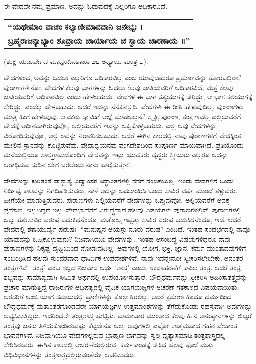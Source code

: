 ಈ ವೇದವೇ ನಮ್ಮ ಪ್ರಮಾಣ. ಅದನ್ನು ಓದುವುದಕ್ಕೆ ಎಲ್ಲರಿಗೂ ಅಧಿಕಾರವಿದೆ.

\smallskip

\begin{longtable}{@{\hspace{-10pt}}l@{}}
\textbf{“ಯಥೇಮಾಂ ವಾಚಂ ಕಲ್ಯಾಣೀಮಾವದಾನಿ ಜನೇಭ್ಯಃ ।} \\
\textbf{ಬ್ರಹ್ಮರಾಜನ್ಯಾಭ್ಯಾಂ ಶೂದ್ರಾಯ ಚಾರ್ಯಾಯ ಚ ಸ್ವಾಯ ಚಾರಣಾಯ ॥”} \\
\end{longtable}

\hfill (ಶುಕ್ಲ ಯಜುರ್ವೇದ ಮಾಧ್ಯಂದಿನಶಾಖಾ ೨೬ ಅಧ್ಯಾಯ ಮಂತ್ರ ೨).

\smallskip

ವೇದಗಳಿಂದ, ಅವನ್ನು ಓದಲು ಎಲ್ಲರಿಗೂ ಅಧಿಕಾರವಿಲ್ಲ ಎಂಬ ಯಾವುದಾದರೂ ಪ್ರಮಾಣವನ್ನು ತೋರಬಲ್ಲಿರಾ? ಪುರಾಣಗಳೇನೋ, ವೇದಗಳ ಕೆಲವು ಭಾಗಗಳನ್ನು ಓದಲು ಕೆಲವು ಜಾತಿಯವರಿಗೆ ಅಧಿಕಾರವಿದೆ, ಮತ್ತೆ ಕೆಲವು ಜಾತಿಯವರಿಗೆ ಅಧಿಕಾರವಿಲ್ಲ ಎಂದು ಹೇಳಬಹುದು. ವೇದಗಳ ಈ ಭಾಗ ಸತ್ಯಯುಗಕ್ಕೆ ಸೇರಿದ್ದು, ಆ ಭಾಗ ಕಲಿಯುಗಕ್ಕೆ ಸೇರಿದ್ದು, ಎಂದೆಲ್ಲ ಹೇಳಬಹುದು. ಆದರೆ ಇದನ್ನು ನೆನಪಿನಲ್ಲಿಡಿ. ವೇದಗಳು ಈ ರೀತಿ ಹೇಳುವುದಿಲ್ಲ. ಪುರಾಣಗಳು ಮಾತ್ರ ಹೀಗೆ ಹೇಳುವುವು. ಸೇವಕರು ಸ್ವಾಮಿಗೆ ಆಜ್ಞೆ ಮಾಡಬಲ್ಲನೆ? ಸ್ಮೃತಿ, ಪುರಾಣ, ತಂತ್ರ ಇವೆಲ್ಲ ಎಲ್ಲಿಯವರೆಗೆ ವೇದಕ್ಕೆ ಅಧೀನವಾಗಿರುವುವೋ, ಅಲ್ಲಿಯವರೆಗೆ ಇವನ್ನು ಒಪ್ಪಿಕೊಳ್ಳಬಹುದು. ಎಲ್ಲಿ ಅವು ವೇದಗಳನ್ನು ವಿರೋಧಿಸುವುವೋ, ಅಲ್ಲಿ ಅವನ್ನು ನಿರಾಕರಿಸಬಹುದು. ಆದರೆ ಈಗಿನ ಕಾಲದಲ್ಲಿ ನಾವು ಪುರಾಣಗಳಿಗೆ ವೇದಕ್ಕಿಂತ ಮೇಲಿನ ಸ್ಥಾನವನ್ನು ಕೊಟ್ಟಿರುವೆವು. ವೇದಾಧ್ಯಯನವು ವಂಗದೇಶದಿಂದ ಸಂಪೂರ್ಣ ಮಾಯವಾಗಿದೆ. ಪ್ರತಿಯೊಂದು ಮನೆಯಲ್ಲಿಯೂ ಸಾಲಿಗ್ರಾಮದೊಂದಿಗೆ ವೇದವನ್ನು ಇಟ್ಟು ಯುವಕರು ವೃದ್ಧರು ಸ್ತ್ರೀಯರು ಎಲ್ಲರೂ ಅದನ್ನು ಆರಾಧಿಸುವ ಸುದಿನ ಬೇಗ ಬರಲೆಂದು ನಾನು ಹಾರೈಸುತ್ತೇನೆ.

ವೇದಗಳನ್ನು ಕುರಿತಂತೆ ಪಾಶ್ಚಾತ್ಯ ವಿದ್ವಾಂಸರ ಸಿದ್ಧಾಂತಗಳಲ್ಲಿ ನನಗೆ ನಂಬಿಕೆಯಿಲ್ಲ. ಇಂದು ವೇದಗಳಿಗೆ ಒಂದು ನಿರ್ದಿಷ್ಟ ಕಾಲವನ್ನು ನಿಗದಿಪಡಿಸುವರು, ನಾಳೆ ಅದನ್ನು ಬದಲಾಯಿಸಿ ಒಂದು ಸಾವಿರ ವರ್ಷ ಮುಂದೆ ತಳ್ಳುವರು. ಹೀಗೆಯೇ ಮಾಡುತ್ತಿರುವರು. ಪುರಾಣಗಳು ಎಲ್ಲಿಯವರೆಗೆ ವೇದಗಳನ್ನು ಒಪ್ಪುವುವೋ, ಅಲ್ಲಿಯವರೆಗೆ ಅವಕ್ಕೆ ಪ್ರಮಾಣ, ಇಲ್ಲದಿದ್ದರೆ ಇಲ್ಲ. ವೇದಭಾವನೆಗೆ ವಿರುದ್ಧವಾದ ಹಲವು ವಿಷಯಗಳು ಪುರಾಣಗಳಲ್ಲಿವೆ. ಪುರಾಣಗಳಲ್ಲಿ ಒಬ್ಬ ಹತ್ತುಸಾವಿರ ವರುಷ ಬದುಕಿದನೆಂದೂ, ಮತ್ತೊಬ್ಬ ಇಪ್ಪತ್ತು ಸಾವಿರ ವರುಷ ಬದುಕಿದನೆಂದೂ, ಇದೆ. ಆದರೆ ವೇದದಲ್ಲಿ ಶತಾಯುರ್ವೈ ಪುರುಷಃ- “ಮನುಷ್ಯನ ಆಯಸ್ಸು ನೂರು ವರುಷ” ಎಂದಿದೆ. ಇಂತಹ ಸಂದರ್ಭದಲ್ಲಿ ನಾವೂ ಯಾವುದನ್ನು ಒಪ್ಪಿಕೊಳ್ಳುವುದು? ನಿಜವಾಗಿಯೂ ವೇದಗಳನ್ನು. ಇಂತಹ ಅಸಂಬದ್ಧ ವಿಷಯಗಳಿದ್ದರೂ ನಾವು ಪುರಾಣಗಳನ್ನು ನಿಕೃಷ್ಟ ದೃಷ್ಟಿಯಿಂದ ನೋಡುವುದಿಲ್ಲ. ಅವುಗಳಲ್ಲಿ ಯೋಗ, ಭಕ್ತಿ, ಜ್ಞಾನ, ಕರ್ಮ ಮುಂತಾದವುಗಳಿಗೆ ಸಂಬಂಧಿಸಿದ ಹಲವು ಸುಂದರವಾದ ಧಾರ್ಮಿಕ ಉಪದೇಶಗಳಿವೆ. ನಾವು ಇವನ್ನೇನೋ ಸ್ವೀಕರಿಸಲೇಬೇಕು. ಅನಂತರ ತಂತ್ರಗಳಿವೆ. ‘ತಂತ್ರ’ ಎಂಬ ಶಬ್ದದ ನಿಜವಾದ ಅರ್ಥ ‘ಶಾಸ್ತ್ರ’ ಎಂದು, ಉದಾಹರಣೆಗೆ ಕಾಪಿಲ ತಂತ್ರ. ಆದರೆ ತಂತ್ರ ಶಬ್ದವನ್ನು ಸಾಮಾನ್ಯವಾಗಿ ಸೀಮಿತ ಅರ್ಥದಲ್ಲಿ ಉಪಯೋಗಿಸುತ್ತಾರೆ. ಬೌದ್ಧಧರ್ಮವನ್ನು ಸ್ವೀಕರಿಸಿ ಅಹಿಂಸಾತತ್ತ್ವವನ್ನು ಪ್ರಚಾರ ಮಾಡುತ್ತಿದ್ದ ರಾಜರುಗಳ ಆಧಿಪತ್ಯದಲ್ಲಿ ವೈದಿಕ ಯಾಗಯಜ್ಞಗಳ ಆಚರಣೆ ಗತಕಾಲದ ವಿಷಯವಾಯಿತು. ಅರಸರಿಗೆ ಅಂಜಿ ಯಾಗ ಸಮಯದಲ್ಲಿ ಪ್ರಾಣಿಗಳನ್ನು ಕೊಲ್ಲುತ್ತಿರಲಿಲ್ಲ. ಆದರೆ ಕ್ರಮೇಣ ಹಿಂದೂ ಧರ್ಮದಿಂದ ಬೌದ್ಧಧರ್ಮಕ್ಕೆ ಮತಾಂತರಗೊಂಡವರೇ ಯಾಗಯಜ್ಞಗಳ ಉತ್ತಮಾಂಶಗಳನ್ನು ತೆಗೆದುಕೊಂಡು ರಹಸ್ಯವಾಗಿ ಅವುಗಳನ್ನು ಅಭ್ಯಸಿಸುತ್ತಿದ್ದರು. ಇದರಿಂದಲೇ ತಂತ್ರಶಾಸ್ತ್ರ ಹುಟ್ಟಿತು. ವಾಮಾಚಾರ ಮುಂತಾದ ಕೆಲವು ಹೀನ ಅನುಷ್ಠಾನಗಳನ್ನು ಬಿಟ್ಟರೆ ತಂತ್ರವು ಜನರು ತಿಳಿದುಕೊಂಡಿರುವಷ್ಟು ಕೆಟ್ಟದೇನೂ ಅಲ್ಲ. ಅವುಗಳಲ್ಲಿ ಎಷ್ಟೋ ಉತ್ತಮವಾದ ಗಹನ ವೇದಾಂತ ಭಾವನೆಗಳಿವೆ. ನಿಜವಾಗಿಯೂ ವೇದಗಳಲ್ಲಿರುವ ಬ್ರಾಹ್ಮಣ ಭಾಗವನ್ನು ಸ್ವಲ್ಪ ವ್ಯತ್ಯಾಸಮಾಡಿ ತಂತ್ರಶಾಸ್ತ್ರದಲ್ಲಿ ಸೇರಿಸಿರುವರು. ಈಗಿನ ಕಾಲದಲ್ಲಿ ಆಚರಣೆಯಲ್ಲಿರುವ, ಕರ್ಮಕಾಂಡಕ್ಕೆ ಸೇರಿದ ಹಲವು ಪೂಜೆ ಮತ್ತು ವಿಧಿವಿಧಾನಗಳನ್ನು ತಂತ್ರಶಾಸ್ತ್ರದಲ್ಲಿರುವಂತೆಯೇ ಆಚರಿಸುವರು.

